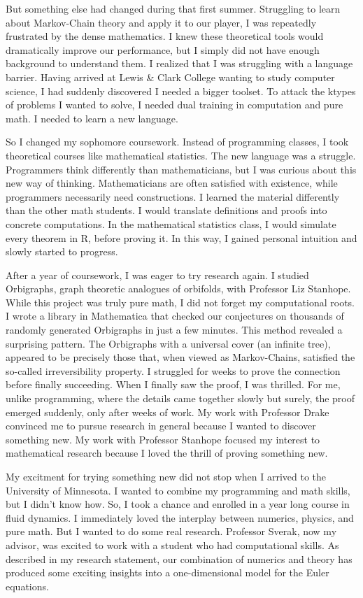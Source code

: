\documentclass[12pt]{article}
\begin{document}
But something else had changed during that first summer. Struggling to learn about Markov-Chain theory and apply it to our player, I was repeatedly frustrated by the dense mathematics. I knew these theoretical tools would dramatically improve our performance, but I simply did not have enough background to understand them. I realized that I was struggling with a language barrier. Having arrived at Lewis \& Clark College wanting to study computer science, I had suddenly discovered I needed a bigger toolset. To attack the ktypes of problems I wanted to solve, I needed dual training in computation and pure math. I needed to learn a new language.

So I changed my sophomore coursework. Instead of programming classes, I took  theoretical courses like mathematical statistics. The new language was a struggle. Programmers think differently than mathematicians, but I was curious about this new way of thinking. Mathematicians are often satisfied with existence, while programmers necessarily need constructions. I learned the material differently than the other math students. I would translate definitions and proofs into concrete computations. In the mathematical statistics class, I would simulate every theorem in R, before proving it. In this way, I gained personal intuition and slowly started to progress.

After a year of coursework, I was eager to try research again. I studied Orbigraphs, graph theoretic analogues of orbifolds, with Professor Liz Stanhope. While this project was truly pure math, I did not forget my computational roots. I wrote a library in Mathematica that checked our conjectures on thousands of randomly generated Orbigraphs in just a few minutes. This method revealed a surprising pattern. The Orbigraphs with a universal cover (an infinite tree), appeared to be precisely those that, when viewed as Markov-Chains, satisfied the so-called irreversibility property. I struggled for weeks to prove the connection before finally succeeding. When I finally saw the proof, I was thrilled. For me, unlike programming, where the details came together slowly but surely, the proof emerged suddenly, only after weeks of work. My work with Professor Drake convinced me to pursue research in general because I wanted to discover something new. My work with Professor Stanhope focused my interest to mathematical research because I loved the thrill of proving something new.

My excitment for trying something new did not stop when I arrived to the University of Minnesota. I wanted to combine my programming and math skills, but I didn't know how. So, I took a chance and enrolled in a year long course in fluid dynamics. I immediately loved the interplay between numerics, physics, and pure math. But I wanted to do some real research. Professor Sverak, now my advisor, was excited to work with a student who had computational skills. As described in my research statement, our combination of numerics and theory has produced some exciting insights into a one-dimensional model for the Euler equations.
\end{document}
